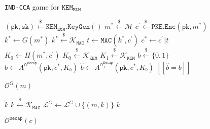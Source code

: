 \documentclass[journal=tches,submission]{iacrtrans}
\newcommand{\pke}{\texttt{PKE}}
\newcommand{\keygen}{\texttt{KeyGen}}
\newcommand{\encrypt}{\texttt{Enc}}
\newcommand{\kem}{\texttt{KEM}}
\newcommand{\decap}{\texttt{Decap}}
\newcommand{\etm}{\texttt{EtM}}  %
\newcommand{\mac}{\texttt{MAC}}
\newcommand{\pk}{\texttt{pk}}
\newcommand{\sk}{\texttt{sk}}
\newcommand{\leftsample}{\stackrel{\$}{\leftarrow}}
\newcommand{\llbrack}{[\![}
\newcommand{\rrbrack}{]\!]}
\begin{document}
\begin{figure}[h]
    \centering
    \begin{minipage}[t]{0.5\textwidth}
        \begin{algorithm}[H]
            \caption*{\texttt{IND-CCA} game for $\kem_\etm$}
            \begin{algorithmic}[1]
                \State $(\pk, \sk) \leftsample \kem_\etm\texttt{.}\keygen()$
                \State $m^\ast \leftsample \mathcal{M}$
                \State $c^\prime \leftsample \pke\texttt{.}\encrypt(\pk, m^\ast)$
                \State $k^\ast \leftarrow G(m^\ast)$
                \State $k^\ast \leftsample \mathcal{K}_\mac$
                \State $t \leftarrow \mac(k^\ast, c^\prime)$
                \State $c^\ast \leftarrow c^\prime \Vert t$
                \State $K_0 \leftarrow H(m^\ast, c^\prime)$
                \State $K_0 \leftsample \mathcal{K}_\kem$
                \State $K_1 \leftsample \mathcal{K}_\kem$
                \State $b \leftsample \{0,1\}$
                \State $\hat{b} \leftarrow A^{\mathcal{O}^\decap}(\pk, c^\ast, K_b)$
                \State $\hat{b} \leftarrow A^{\mathcal{O}^\decap_1}(\pk, c^\ast, K_b)$
                \State \Return $\llbrack \hat{b} = b \rrbrack$
            \end{algorithmic}
        \end{algorithm}
        \begin{algorithm}[H]
            \caption*{$\mathcal{O}^G(m)$}
            \begin{algorithmic}[1]
                    \State \Return $\tilde{k}$
                \EndIf
                \State $k \leftsample \mathcal{K}_\mac$
                \State $\mathcal{L}^G \leftarrow \mathcal{L}^G \cup \{(m, k)\}$
                \State \Return $k$
            \end{algorithmic}
        \end{algorithm}
    \end{minipage}
    \begin{minipage}[t]{0.49\textwidth}
        \begin{algorithm}[H]
            \caption*{$\mathcal{O}^\decap(c)$}
            \begin{algorithmic}[1]

\end{algorithmic}
\end{algorithm}
\end{minipage}
\end{figure}
\end{document}
